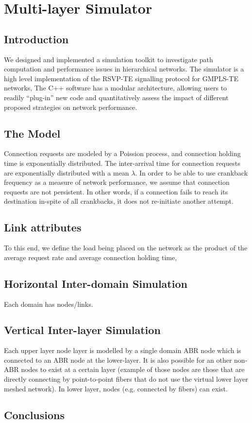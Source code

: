 \chapter{Multi-layer Simulator}
\label{cha:Simulator}

\section{Introduction}
We designed and implemented a simulation toolkit to investigate path computation and performance issues in hierarchical networks. The simulator is a high level implementation of the RSVP-TE signalling protocol for GMPLS-TE networks, The C++ software has a modular architecture, allowing users to readily ``plug-in'' new code and quantitatively assess the impact of different proposed strategies on network performance. 

\section{The Model}
Connection requests are modeled by a Poission process, and connection holding time is exponentially distributed. The inter-arrival time for connection requests are exponentially distributed with a mean $\lambda$.
In order to be able to use crankback frequency as a measure of network performance, we assume that connection requests are not persistent. In other words, if a connection fails to reach its destination in-spite of all crankbacks, it does not re-initiate another attempt. 

\section {Link attributes}

To this end, we define the load being placed on the network as the product of the average request rate and average connection holding time, 
\section{Horizontal Inter-domain Simulation}
Each domain has nodes/links.

\section{Vertical Inter-layer Simulation}
Each upper layer node layer is modelled by a single domain ABR node which is connected to an ABR node at the lower-layer. It is also possible for an other non-ABR nodes to exist at a certain layer (example of those nodes are those that are directly connecting by point-to-point fibers that do not use the virtual lower layer meshed network). In lower layer, nodes (e.g. connected by fibers) can exist.
 
\section{Conclusions}
